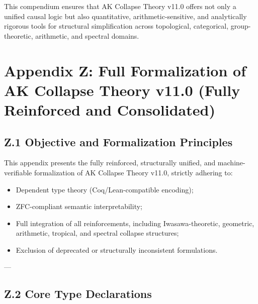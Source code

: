 \documentclass[11pt]{article}
\begin{document}
This compendium ensures that AK Collapse Theory v11.0 offers not only a unified causal logic but also quantitative, arithmetic-sensitive, and analytically rigorous tools for structural simplification across topological, categorical, group-theoretic, arithmetic, and spectral domains.




\section*{Appendix Z: Full Formalization of AK Collapse Theory v11.0 (Fully Reinforced and Consolidated)}

\subsection*{Z.1 Objective and Formalization Principles}

This appendix presents the fully reinforced, structurally unified, and machine-verifiable formalization of AK Collapse Theory v11.0, strictly adhering to:

\begin{itemize}
    \item Dependent type theory (Coq/Lean-compatible encoding);
    \item ZFC-compliant semantic interpretability;
    \item Full integration of all reinforcements, including Iwasawa-theoretic, geometric, arithmetic, tropical, and spectral collapse structures;
    \item Exclusion of deprecated or structurally inconsistent formulations.
\end{itemize}

---

\subsection*{Z.2 Core Type Declarations}
\end{document}
